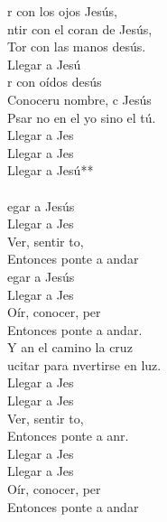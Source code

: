 \begin{cancion}%
	r con los ojos Jesús,\\
	ntir con el coran de Jesús,\\
	Tor con las manos desús.\\
	Llegar a Jesú   \\
	r con oídos desús \\
	Conoceru nombre, c Jesús\\
	Psar no en el yo sino el tú.\\
	Llegar a Jes \\
	Llegar a Jes\\
	Llegar a Jesú**\\
	\jump\\
	egar a Jesús\\
	Llegar a Jes\\
	Ver, sentir to,    \\
	Entonces ponte a andar\\
	egar a Jesús\\
	Llegar a Jes\\
	Oír, conocer, per   \\
	Entonces ponte a andar.\\
	Y an el camino  la cruz\\
	ucitar para nvertirse en luz.\\
	Llegar a Jes \\
	Llegar a Jes\\
	Ver, sentir to,    \\
	Entonces ponte a anr.\\
	Llegar a Jes \\
	Llegar a Jes\\
	Oír, conocer, per   \\
	Entonces ponte a andar\\
\end{cancion}%
